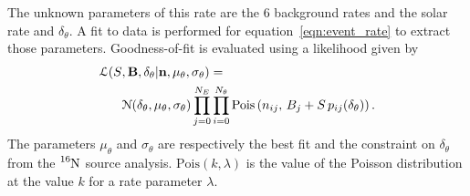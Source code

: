 The unknown parameters of this rate are the 6 background rates and the solar
rate and $\delta_{\theta}$.
A fit to data is performed for equation~\eqref{eqn:event_rate} to extract
those parameters.
Goodness-of-fit is evaluated using a likelihood given by
\begin{align}
    \mathcal{L}(S&, \bold{B}, \delta_{\theta} | \bold{n}, \mu_{\theta}, \sigma_{\theta}) = \nonumber\\
    &\mathcal{N}(\delta_{\theta}, \mu_{\theta}, \sigma_\theta)
    \prod_{j=0}^{N_E}\prod^{N_{\theta}}_{i=0} \text{Pois}\left(n_{ij},\, B_{j} + S\,p_{ij}(\delta_{\theta})\right)\text{.}
    \label{eq:ll}
\end{align}
The parameters $\mu_{\theta}$ and $\sigma_{\theta}$ are respectively the best
fit and the constraint on $\delta_{\theta}$ from the $\ce{^{16}N}$ source
analysis.
$\text{Pois}\left(k, \lambda \right)$ is the value of the Poisson distribution
at the value $k$ for a rate parameter $\lambda$.
